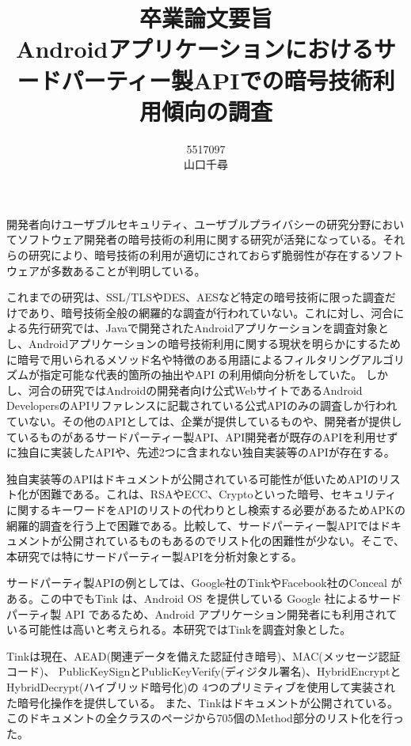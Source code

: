 \documentclass[twocolumn, 10pt, a4paper]{jarticle}
\title{\vspace{-3cm}
{\large 卒業論文要旨}\\
{\bf
Androidアプリケーションにおけるサードパーティー製APIでの暗号技術利用傾向の調査
}
}
\author{
5517097 \\		%
山口千尋		%
}
\date{}
\begin{document}
\maketitle
\thispagestyle{empty}

開発者向けユーザブルセキュリティ、ユーザブルプライバシーの研究分野においてソフトウェア開発者の暗号技術の利用に関する研究が活発になっている。それらの研究により、暗号技術の利用が適切にされておらず脆弱性が存在するソフトウェアが多数あることが判明している。

これまでの研究は、SSL/TLSやDES、AESなど特定の暗号技術に限った調査だけであり、暗号技術全般の網羅的な調査が行われていない。これに対し、河合による先行研究\cite{Kawai}では、Javaで開発されたAndroidアプリケーションを調査対象とし、Androidアプリケーションの暗号技術利用に関する現状を明らかにするために暗号で用いられるメソッド名や特徴のある用語によるフィルタリングアルゴリズムが指定可能な代表的箇所の抽出やAPI の利用傾向分析をしていた。
しかし、河合の研究ではAndroidの開発者向け公式WebサイトであるAndroid Developers\cite{Android_Developers}のAPIリファレンスに記載されている公式APIのみの調査しか行われていない。その他のAPIとしては、企業が提供しているものや、開発者が提供しているものがあるサードパーティー製API、API開発者が既存のAPIを利用せずに独自に実装したAPIや、先述2つに含まれない独自実装等のAPIが存在する。


独自実装等のAPIはドキュメントが公開されている可能性が低いためAPIのリスト化が困難である。これは、RSAやECC、Cryptoといった暗号、セキュリティに関するキーワードをAPIのリストの代わりとし検索する必要があるためAPKの網羅的調査を行う上で困難である。比較して、サードパーティー製APIではドキュメントが公開されているものもあるのでリスト化の困難性が少ない。そこで、本研究では特にサードパーティー製APIを分析対象とする。

サードパーティ製APIの例としては、Google社のTink\cite{Tink}やFacebook社のConceal\cite{Conceal}
がある。この中でもTink は、Android OS を提供している Google 社によるサードパーティ製 API であるため、Android
アプリケーション開発者にも利用されている可能性は高いと考えられる。本研究ではTinkを調査対象とした。

Tinkは現在、AEAD(関連データを備えた認証付き暗号)、MAC(メッセージ認証コード)、
PublicKeySignとPublicKeyVerify(ディジタル署名)、HybridEncryptとHybridDecrypt(ハイブリッド暗号化)の
4つのプリミティブを使用して実装された暗号化操作を提供している。
また、Tinkはドキュメントが公開されている。
このドキュメントの全クラスのページから705個のMethod部分のリスト化を行った。
\end{document}

